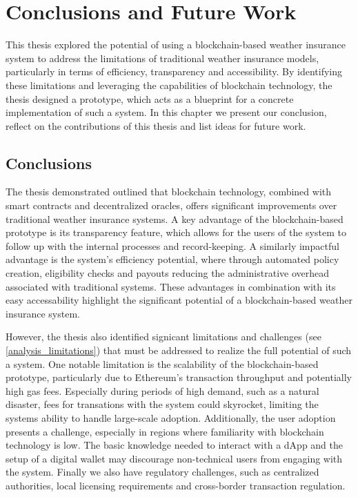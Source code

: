 \chapter{Conclusions and Future Work}\label{chapter:summary_conclusion}
This thesis explored the potential of using a blockchain-based weather insurance system to address the limitations of traditional weather insurance models, particularly in terms of efficiency, transparency and accessibility. By identifying these limitations and leveraging the capabilities of blockchain technology, the thesis designed a prototype, which acts as a blueprint for a concrete implementation of such a system. In this chapter we present our conclusion, reflect on the contributions of this thesis and list ideas for future work.

\section{Conclusions}\label{section:conclusions}
The thesis demonstrated outlined that blockchain technology, combined with smart contracts and decentralized oracles, offers significant improvements over traditional weather insurance systems. A key advantage of the blockchain-based prototype is its transparency feature, which allows for the users of the system to follow up with the internal processes and record-keeping. A similarly impactful advantage is the system's efficiency potential, where through automated policy creation, eligibility checks and payouts reducing the administrative overhead associated with traditional systems. These advantages in combination with its easy accessability highlight the significant potential of a blockchain-based weather insurance system. 

However, the thesis also identified signicant limitations and challenges (see \cref{analysis_limitations}) that must be addressed to realize the full potential of such a system. One notable limitation is the scalability of the blockchain-based prototype, particularly due to Ethereum's transaction throughput and potentially high gas fees. Especially during periods of high demand, such as a natural disaster, fees for transations with the system could skyrocket, limiting the systems ability to handle large-scale adoption. Additionally, the user adoption presents a challenge, especially in regions where familiarity with blockchain technology is low. The basic knowledge needed to interact with a dApp and the setup of a digital wallet may discourage non-technical users from engaging with the system. Finally we also have regulatory challenges, such as centralized authorities, local licensing requirements and cross-border transaction regulation.

